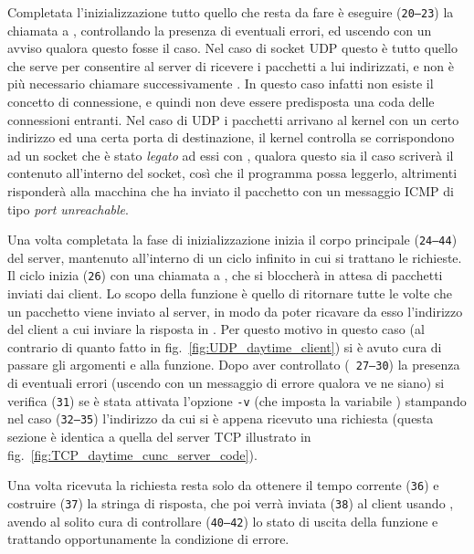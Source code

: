 Completata l'inizializzazione tutto quello che resta da fare è eseguire
(\texttt{\small 20--23}) la chiamata a , controllando la presenza
di eventuali errori, ed uscendo con un avviso qualora questo fosse il caso.
Nel caso di socket UDP questo è tutto quello che serve per consentire al
server di ricevere i pacchetti a lui indirizzati, e non è più necessario
chiamare successivamente . In questo caso infatti non esiste il
concetto di connessione, e quindi non deve essere predisposta una coda delle
connessioni entranti. Nel caso di UDP i pacchetti arrivano al kernel con un
certo indirizzo ed una certa porta di destinazione, il kernel controlla se
corrispondono ad un socket che è stato \textsl{legato} ad essi con
, qualora questo sia il caso scriverà il contenuto all'interno del
socket, così che il programma possa leggerlo, altrimenti risponderà alla
macchina che ha inviato il pacchetto con un messaggio ICMP di tipo
\textit{port unreachable}.

Una volta completata la fase di inizializzazione inizia il corpo principale
(\texttt{\small 24--44}) del server, mantenuto all'interno di un ciclo
infinito in cui si trattano le richieste. Il ciclo inizia (\texttt{\small 26})
con una chiamata a , che si bloccherà in attesa di pacchetti
inviati dai client. Lo scopo della funzione è quello di ritornare tutte le
volte che un pacchetto viene inviato al server, in modo da poter ricavare da
esso l'indirizzo del client a cui inviare la risposta in . Per
questo motivo in questo caso (al contrario di quanto fatto in
fig.~\ref{fig:UDP_daytime_client}) si è avuto cura di passare gli argomenti
 e  alla funzione.  Dopo aver controllato (\texttt{\small
  27--30}) la presenza di eventuali errori (uscendo con un messaggio di errore
qualora ve ne siano) si verifica (\texttt{\small 31}) se è stata attivata
l'opzione \texttt{-v} (che imposta la variabile ) stampando nel
caso (\texttt{\small 32--35}) l'indirizzo da cui si è appena ricevuto una
richiesta (questa sezione è identica a quella del server TCP illustrato in
fig.~\ref{fig:TCP_daytime_cunc_server_code}).

Una volta ricevuta la richiesta resta solo da ottenere il tempo corrente
(\texttt{\small 36}) e costruire (\texttt{\small 37}) la stringa di risposta,
che poi verrà inviata (\texttt{\small 38}) al client usando ,
avendo al solito cura di controllare (\texttt{\small 40--42}) lo stato di
uscita della funzione e trattando opportunamente la condizione di errore.

